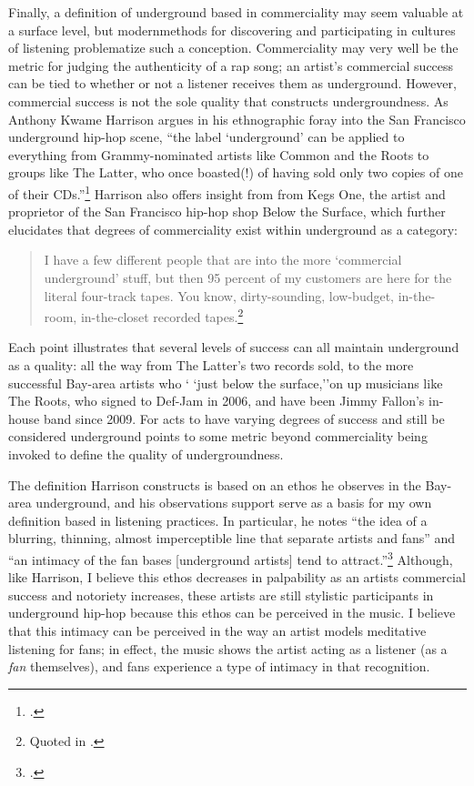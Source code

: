 Finally, a definition of underground based in commerciality may seem valuable at a surface 
level, but modernmethods for discovering and participating in cultures of listening problematize
such a conception. Commerciality may very well be the metric for judging the authenticity of a 
rap song; an artist's commercial success can be tied to whether or not a listener receives them 
as  underground. However, commercial success is not the sole quality that constructs undergroundness. 
As Anthony Kwame Harrison argues in his ethnographic foray into the San Francisco underground 
hip-hop scene, ``the label `underground' can be applied to everything from Grammy-nominated 
artists like Common and the Roots to groups like The Latter, who once boasted(!) of having sold
only two copies of one of their CDs.''\footnote{
    \autocite[9]{anthonykwameharrisonHipHopUnderground2009}.}
Harrison also offers insight from from Kegs One, the artist and proprietor of the San Francisco 
hip-hop shop Below the Surface, which further elucidates that degrees of commerciality exist 
within underground as a category:
    \begin{quote}
        I have a few different people that are into the more `commercial underground' stuff, 
        but then 95 percent of my customers are here for the  literal four-track tapes. You 
        know,  dirty-sounding, low-budget, in-the-room, in-the-closet recorded 
        tapes.\footnote{
            Quoted in \autocite[10]{anthonykwameharrisonHipHopUnderground2009}.}
    \end{quote}
Each point illustrates that several levels of success can all maintain underground as a quality:
all the way from The Latter's two records sold, to the more successful Bay-area artists who `
`just below the surface,''on up musicians like The Roots, who signed to Def-Jam in 2006, and have
been Jimmy Fallon's in-house band since 2009. For acts to have varying degrees of success and 
still be considered  underground points to some metric beyond commerciality being invoked to 
define the quality of undergroundness.

The definition Harrison constructs is based on an ethos he observes in the Bay-area underground,
and his observations support serve as a basis for my own definition based in listening practices.
In particular, he notes ``the idea of a blurring, thinning, almost imperceptible line that separate
artists and fans'' and ``an intimacy of the fan bases [underground artists] tend to 
attract.''\footnote{
    \autocite[10--11]{anthonykwameharrisonHipHopUnderground2009}.}
Although, like Harrison, I believe this ethos decreases in palpability as an artists commercial 
success and notoriety increases, these artists are still stylistic participants in underground 
hip-hop because this ethos can be perceived in the music. I believe that this intimacy can be 
perceived in the way an artist models meditative listening for fans; in effect, the music shows
the artist acting as a listener (as a \emph{fan} themselves), and fans experience a type of
intimacy in that recognition.

